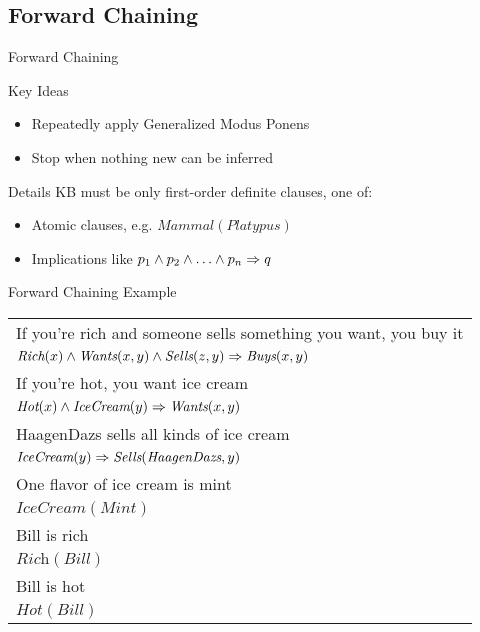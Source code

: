 \documentclass[14pt]{beamer}
\begin{document}
\subsection{Forward Chaining}

\begin{frame}{Forward Chaining}
	\begin{block}{Key Ideas}
		\begin{itemize}
			\item Repeatedly apply Generalized Modus Ponens
			\item Stop when nothing new can be inferred
		\end{itemize}
	\end{block}
	\pause
	\begin{block}{Details}
		KB must be only \alert{first-order definite clauses}, one of:
		\begin{itemize}
			\item Atomic clauses, e.g. $\textit{Mammal}(\textit{Platypus})$
			\item Implications like $p_1 \land p_2 \land \ldots \land p_n \Rightarrow q$
		\end{itemize}
	\end{block}
\end{frame}

\begin{frame}{Forward Chaining Example}
	\begin{tabular}{p{}}
		If you're rich and someone sells something you want, you buy it \\
		\tab$\textit{Rich}(x) \land \textit{Wants}(x, y) \land \textit{Sells}(z, y) \Rightarrow \textit{Buys}(x, y)$ \\
		If you're hot, you want ice cream \\
		\tab$\textit{Hot}(x) \land \textit{IceCream}(y) \Rightarrow \textit{Wants}(x, y)$ \\
		HaagenDazs sells all kinds of ice cream \\
		\tab$\textit{IceCream}(y) \Rightarrow \textit{Sells}(\textit{HaagenDazs}, y)$ \\
		One flavor of ice cream is mint \\
		\tab$\textit{IceCream}(\textit{Mint})$ \\
		Bill is rich \\
		\tab$\textit{Rich}(\textit{Bill})$ \\
		Bill is hot \\
		\tab$\textit{Hot}(\textit{Bill})$
	\end{tabular}
\end{frame}
\end{document}
